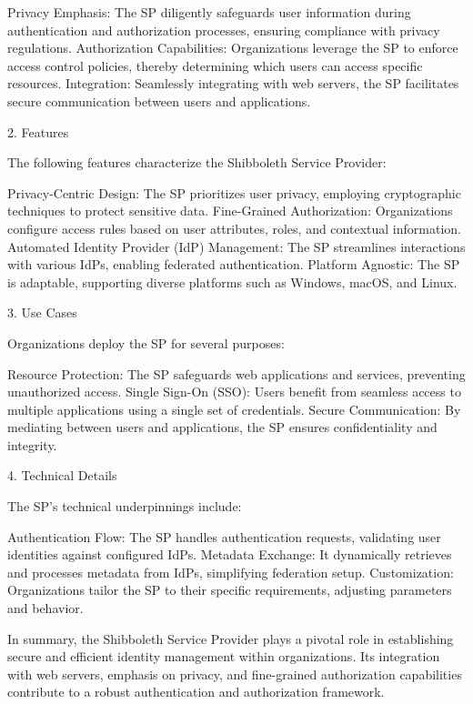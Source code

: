 \documentclass{report}
\begin{document}
    Privacy Emphasis: The SP diligently safeguards user information during authentication and authorization processes, ensuring compliance with privacy regulations.
    Authorization Capabilities: Organizations leverage the SP to enforce access control policies, thereby determining which users can access specific resources.
    Integration: Seamlessly integrating with web servers, the SP facilitates secure communication between users and applications.

2. Features

The following features characterize the Shibboleth Service Provider:

    Privacy-Centric Design: The SP prioritizes user privacy, employing cryptographic techniques to protect sensitive data.
    Fine-Grained Authorization: Organizations configure access rules based on user attributes, roles, and contextual information.
    Automated Identity Provider (IdP) Management: The SP streamlines interactions with various IdPs, enabling federated authentication.
    Platform Agnostic: The SP is adaptable, supporting diverse platforms such as Windows, macOS, and Linux.

3. Use Cases

Organizations deploy the SP for several purposes:

    Resource Protection: The SP safeguards web applications and services, preventing unauthorized access.
    Single Sign-On (SSO): Users benefit from seamless access to multiple applications using a single set of credentials.
    Secure Communication: By mediating between users and applications, the SP ensures confidentiality and integrity.

4. Technical Details

The SP’s technical underpinnings include:

    Authentication Flow: The SP handles authentication requests, validating user identities against configured IdPs.
    Metadata Exchange: It dynamically retrieves and processes metadata from IdPs, simplifying federation setup.
    Customization: Organizations tailor the SP to their specific requirements, adjusting parameters and behavior.

In summary, the Shibboleth Service Provider plays a pivotal role in establishing secure and efficient identity management within organizations. Its integration with web servers, emphasis on privacy, and fine-grained authorization capabilities contribute to a robust authentication and authorization framework.
\end{document}
